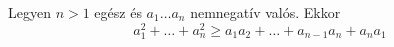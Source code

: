 Legyen $n>1$ egész és $a_{1}\hdots a_{n}$ nemnegatív valós. Ekkor
$$
a_{1}^{2}+\hdots +a_{n}^{2} \ge a_{1}a_{2}+\hdots+a_{n-1}a_{n}+a_{n}a_{1}
$$
